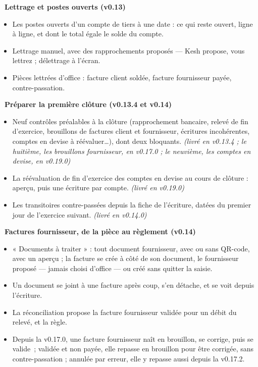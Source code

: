 \documentclass[a4paper,11pt,oneside]{article}
\begin{document}
\vspace{0.4cm}

\textbf{\color{keshSuccess}\faCheckCircle\ Lettrage et postes ouverts (v0.13)}

\begin{itemize}
    \item Les postes ouverts d'un compte de tiers à une date : ce qui reste ouvert, ligne à ligne, et dont le total égale le solde du compte.
    \item Lettrage manuel, avec des rapprochements proposés --- Kesh propose, vous lettrez ; délettrage à l'écran.
    \item Pièces lettrées d'office : facture client soldée, facture fournisseur payée, contre-passation.
\end{itemize}

\vspace{0.4cm}

\textbf{\color{keshSuccess}\faCheckCircle\ Préparer la première clôture (v0.13.4 et v0.14)}

\begin{itemize}
    \item Neuf contrôles préalables à la clôture (rapprochement bancaire, relevé de fin d'exercice, brouillons de factures client et fournisseur, écritures incohérentes, comptes en devise à réévaluer\ldots), dont deux bloquants. \emph{(livré en v0.13.4 ; le huitième, les brouillons fournisseur, en v0.17.0 ; le neuvième, les comptes en devise, en v0.19.0)}
    \item La réévaluation de fin d'exercice des comptes en devise au cours de clôture : aperçu, puis une écriture par compte. \emph{(livré en v0.19.0)}
    \item Les transitoires contre-passées depuis la fiche de l'écriture, datées du premier jour de l'exercice suivant. \emph{(livré en v0.14.0)}
\end{itemize}

\vspace{0.4cm}

\textbf{\color{keshSuccess}\faCheckCircle\ Factures fournisseur, de la pièce au règlement (v0.14)}

\begin{itemize}
    \item « Documents à traiter » : tout document fournisseur, avec ou sans QR-code, avec un aperçu ; la facture se crée à côté de son document, le fournisseur proposé --- jamais choisi d'office --- ou créé sans quitter la saisie.
    \item Un document se joint à une facture après coup, s'en détache, et se voit depuis l'écriture.
    \item La réconciliation propose la facture fournisseur validée pour un débit du relevé, et la règle.
    \item Depuis la v0.17.0, une facture fournisseur naît en brouillon, se corrige, puis se valide~; validée et non payée, elle repasse en brouillon pour être corrigée, sans contre-passation ; annulée par erreur, elle y repasse aussi depuis la v0.17.2.
\end{itemize}
\end{document}
